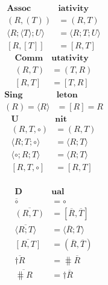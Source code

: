\documentclass[12pt, oneside]{article}
\theoremstyle{plain}
\theoremstyle{definition}
\let\originaldagger\dagger
\renewcommand{\dag}{\mathord{\originaldagger}}
\newcommand{\la}{\langle}
\newcommand{\ra}{\rangle}
\newcommand{\unit}{\circ}
\begin{document}
\begin{figure}[ht!]
{\begin{minipage}{0.95\textwidth}
\begin{minipage}{0.45\textwidth}
                \begin{align*}
                    \textbf{Assoc}&\textbf{iativity} \\
                    (R,(T)) &= (R,T) \\
                    \la R;\la T\ra; U\ra &= \la R;T;U\ra \\
                    [R,[T]] &= [R,T]
                \end{align*}
                \begin{align*}
                    \textbf{Comm}&\textbf{utativity}\\
                    (R, T) &= (T, R) \\
                    [R, T] &= [T, R]
                \end{align*}
                \begin{align*}
                    \textbf{Sing}&\textbf{leton} \\
                    (R) = \la R\ra &= [R] = R
                \end{align*}
                \begin{align*}
                    \textbf{U}&\textbf{nit} \\
                    (R,T,\unit) &= (R,T) \\
                    \la R;T;\unit\ra &= \la R;T\ra \\
                    \la\unit;R;T\ra &= \la R;T\ra \\
                    [R,T,\unit] &= [R,T] \\
                \end{align*}
            \end{minipage}
            \hfill
            \begin{minipage}{0.45\textwidth}
                \begin{align*}
                    \textbf{D}&\textbf{ual} \\
                    \overline{\unit} &= \unit \\
                    \overline{(R,T)} &= [\overline{R},\overline{T}] \\
                    \overline{\la R;T\ra} &= \la \overline{R};\overline{T}\ra \\
                    \overline{[R,T]} &= (\overline{R},\overline{T}) \\
                    \overline{\dag R} &= \hash\overline{R} \\
                    \overline{\hash R} &= \dag \overline{R} \\

\end{align*}
\end{minipage}
\end{minipage}}
\end{figure}
\end{document}
